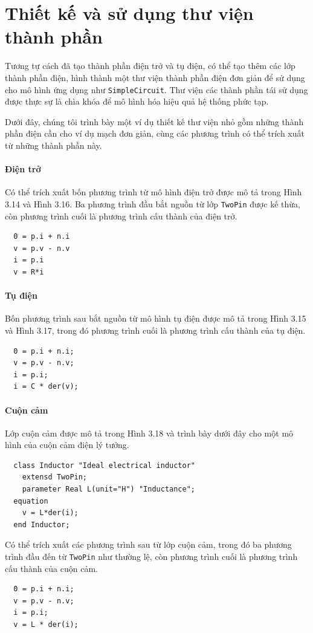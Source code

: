 \section{Thiết kế và sử dụng thư viện thành phần}
Tương tự cách đã tạo thành phần điện trở và tụ điện, có thể tạo thêm các lớp thành phần điện, hình thành một thư viện thành phần điện đơn giản để sử dụng cho mô hình ứng dụng như \texttt{SimpleCircuit}. Thư viện các thành phần tái sử dụng được thực sự là chìa khóa để mô hình hóa hiệu quả hệ thống phức tạp.

Dưới đây, chúng tôi trình bày một ví dụ thiết kế thư viện nhỏ gồm những thành phần điện cần cho ví dụ mạch đơn giản, cùng các phương trình có thể trích xuất từ những thành phần này.

\paragraph*{Điện trở}
Có thể trích xuất bốn phương trình từ mô hình điện trở được mô tả trong Hình 3.14 và Hình 3.16. Ba phương trình đầu bắt nguồn từ lớp \texttt{TwoPin} được kế thừa, còn phương trình cuối là phương trình cấu thành của điện trở.
\begin{verbatim}
  0 = p.i + n.i
  v = p.v - n.v
  i = p.i
  v = R*i
\end{verbatim}

\paragraph*{Tụ điện}
Bốn phương trình sau bắt nguồn từ mô hình tụ điện được mô tả trong Hình 3.15 và Hình 3.17, trong đó phương trình cuối là phương trình cấu thành của tụ điện.
\begin{verbatim}
  0 = p.i + n.i;
  v = p.v - n.v;
  i = p.i;
  i = C * der(v);
\end{verbatim}

\paragraph*{Cuộn cảm}
Lớp cuộn cảm được mô tả trong Hình 3.18 và trình bày dưới đây cho một mô hình của cuộn cảm điện lý tưởng.
\begin{verbatim}
  class Inductor "Ideal electrical inductor"
    extensd TwoPin;
    parameter Real L(unit="H") "Inductance";
  equation
    v = L*der(i);
  end Inductor;
\end{verbatim}
Có thể trích xuất các phương trình sau từ lớp cuộn cảm, trong đó ba phương trình đầu đến từ \texttt{TwoPin} như thường lệ, còn phương trình cuối là phương trình cấu thành của cuộn cảm.
\begin{verbatim}
  0 = p.i + n.i;
  v = p.v - n.v;
  i = p.i;
  v = L * der(i);
\end{verbatim}

